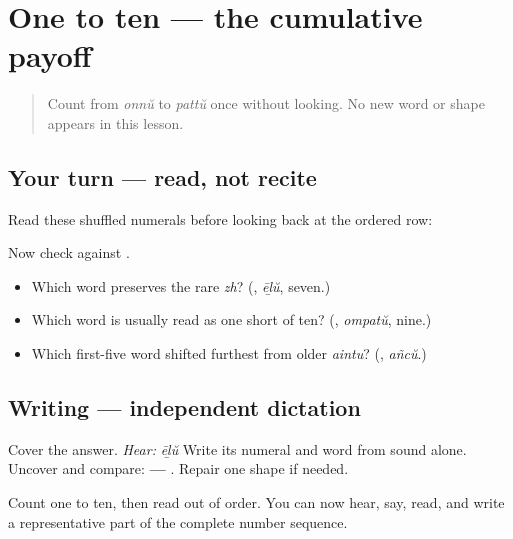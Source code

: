 \section[Practice]{One to ten — the cumulative payoff}

\label{lesson:ML-C07-numbers-practice}



\begin{quote}
Count from \emph{onnŭ} to \emph{pattŭ} once without looking. No new word or shape appears in this lesson.
\end{quote}

\subsection*{Your turn — read, not recite}
Read these shuffled numerals before looking back at the ordered row:

\begin{quote}
\textbf{    }
\end{quote}

\begin{quote}
\textbf{    }
\end{quote}

Now check against \textbf{         }.

\begin{culture}
\begin{itemize}
\raggedright
  \item Which word preserves the rare \emph{zh}? (\textbf{}, \emph{ēḻŭ}, seven.)
  \item Which word is usually read as one short of ten? (\textbf{}, \emph{ompatŭ}, nine.)
  \item Which first-five word shifted furthest from older \emph{aintu}? (\textbf{}, \emph{añcŭ}.)
\end{itemize}
\end{culture}

\subsection*{Writing — independent dictation}
Cover the answer. \emph{Hear:} \emph{ēḻŭ} Write its numeral and word from sound alone. Uncover and compare: \textbf{ — }. Repair one shape if needed.

\begin{tcolorbox}[breakable,colback=teal!4,colframe=teal!35!black,title={Before you move on}]
Count one to ten, then read \textbf{  } out of order. You can now hear, say, read, and write a representative part of the complete number sequence.
\end{tcolorbox}
